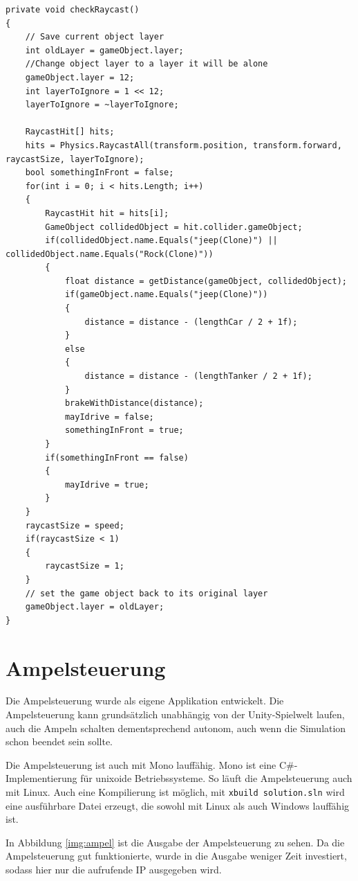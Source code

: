 \begin{lstlisting}[caption={Erkennen von anderen Fahrzeugen und Hindernissen},label={lst:Hinderniss_erkennen}]
private void checkRaycast()
{
	// Save current object layer
	int oldLayer = gameObject.layer;
	//Change object layer to a layer it will be alone
	gameObject.layer = 12;
	int layerToIgnore = 1 << 12;
	layerToIgnore = ~layerToIgnore;

	RaycastHit[] hits;		
	hits = Physics.RaycastAll(transform.position, transform.forward, raycastSize, layerToIgnore);
	bool somethingInFront = false;
	for(int i = 0; i < hits.Length; i++)
	{
		RaycastHit hit = hits[i];
		GameObject collidedObject = hit.collider.gameObject;
		if(collidedObject.name.Equals("jeep(Clone)") || collidedObject.name.Equals("Rock(Clone)"))
		{
			float distance = getDistance(gameObject, collidedObject);
			if(gameObject.name.Equals("jeep(Clone)"))
			{
				distance = distance - (lengthCar / 2 + 1f);
			}
			else
			{
				distance = distance - (lengthTanker / 2 + 1f);
			}
			brakeWithDistance(distance);
			mayIdrive = false;
			somethingInFront = true;
		}
		if(somethingInFront == false)
		{
			mayIdrive = true;
		}
	}
	raycastSize = speed;
	if(raycastSize < 1)
	{
		raycastSize = 1;
	}
	// set the game object back to its original layer
	gameObject.layer = oldLayer;
}
\end{lstlisting}

\section{Ampelsteuerung}
\label{Ampelsteuerung}

Die Ampelsteuerung wurde als eigene Applikation entwickelt. Die Ampelsteuerung kann grundsätzlich unabhängig von der Unity-Spielwelt laufen, auch die Ampeln schalten dementsprechend autonom, auch wenn die Simulation schon beendet sein sollte.


Die Ampelsteuerung ist auch mit Mono lauffähig. Mono ist eine C\#-Implementierung für unixoide Betriebssysteme. So läuft die Ampelsteuerung auch mit Linux. Auch eine Kompilierung ist möglich, mit \texttt{xbuild solution.sln} wird eine ausführbare Datei erzeugt, die sowohl mit Linux als auch Windows lauffähig ist.

In Abbildung \ref{img:ampel} ist die Ausgabe der Ampelsteuerung zu sehen. Da die Ampelsteuerung gut funktionierte, wurde in die Ausgabe weniger Zeit investiert, sodass hier nur die aufrufende IP ausgegeben wird.


